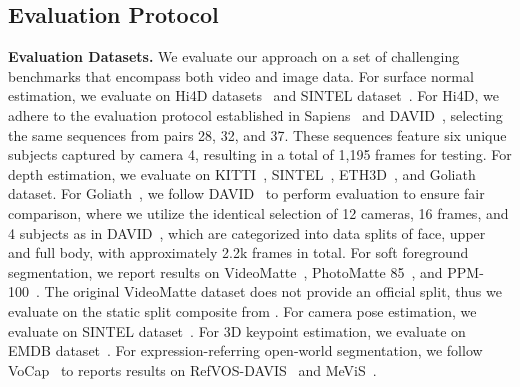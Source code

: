 \documentclass[11pt, a4paper, logo, onecolumn]{googledeepmind}
\begin{document}
\subsection{Evaluation Protocol}
\textbf{{Evaluation Datasets.}} We evaluate our approach on a set of challenging benchmarks that encompass both video and image data. For surface normal estimation, we evaluate on Hi4D datasets~\cite{yin2023hi4d} and SINTEL dataset~\cite{butler2012naturalistic}. For Hi4D, we adhere to the evaluation protocol established in Sapiens~\cite{sapienseccv2024} and DAVID~\cite{saleh2025david}, selecting the same sequences from pairs 28, 32, and 37. These sequences feature six unique subjects captured by camera 4, resulting in a total of 1,195 frames for testing. 
For depth estimation, we evaluate on KITTI~\cite{geiger2013vision}, SINTEL~\cite{butler2012naturalistic}, ETH3D~\cite{schops2017multi}, and Goliath~\cite{martinez2024codec} dataset. For Goliath~\cite{martinez2024codec}, we follow DAVID~\cite{saleh2025david} to perform evaluation to ensure fair comparison, where we utilize the identical selection of 12 cameras, 16 frames, and 4 subjects as in DAVID~\cite{saleh2025david}, which are categorized into data splits of face, upper and full body, with approximately 2.2k frames in total.
For soft foreground segmentation, we report results on VideoMatte~\cite{lin2021real}, PhotoMatte 85~\cite{lin2021real}, and PPM-100~\cite{ke2022modnet}. The original VideoMatte dataset does not provide an official split, thus we evaluate on the static split composite from \cite{lin2022robust}. For camera pose estimation, we evaluate on SINTEL dataset~\cite{butler2012naturalistic}. 
For 3D keypoint estimation, we evaluate on EMDB dataset~\cite{kaufmann2023emdb}.
For expression-referring open-world segmentation, we follow VoCap~\cite{uijlings2025vocap} to reports results on RefVOS-DAVIS~\cite{khoreva2018video} and MeViS~\cite{ding2023mevis}.
\end{document}
